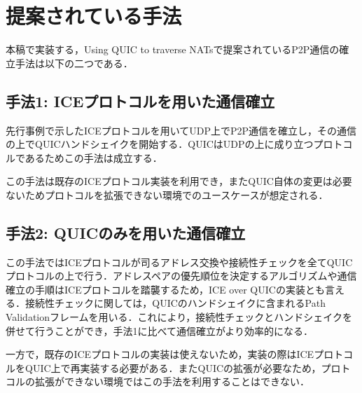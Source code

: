 \section{提案されている手法}
本稿で実装する，Using QUIC to traverse NATsで提案されているP2P通信の確立手法は以下の二つである．

\subsection{手法1: ICEプロトコルを用いた通信確立}
先行事例で示したICEプロトコルを用いてUDP上でP2P通信を確立し，その通信の上でQUICハンドシェイクを開始する．QUICはUDPの上に成り立つプロトコルであるためこの手法は成立する．

この手法は既存のICEプロトコル実装を利用でき，またQUIC自体の変更は必要ないためプロトコルを拡張できない環境でのユースケースが想定される．

\subsection{手法2: QUICのみを用いた通信確立}
この手法ではICEプロトコルが司るアドレス交換や接続性チェックを全てQUICプロトコルの上で行う．アドレスペアの優先順位を決定するアルゴリズムや通信確立の手順はICEプロトコルを踏襲するため，ICE over QUICの実装とも言える．接続性チェックに関しては，QUICのハンドシェイクに含まれるPath Validationフレームを用いる．これにより，接続性チェックとハンドシェイクを併せて行うことができ，手法1に比べて通信確立がより効率的になる．

一方で，既存のICEプロトコルの実装は使えないため，実装の際はICEプロトコルをQUIC上で再実装する必要がある．またQUICの拡張が必要なため，プロトコルの拡張ができない環境ではこの手法を利用することはできない．
